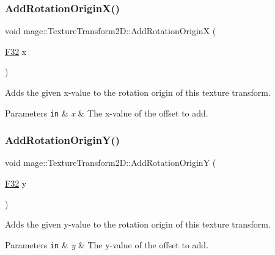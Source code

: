 \subsubsection{\texorpdfstring{Add\+Rotation\+Origin\+X()}{AddRotationOriginX()}}
{\footnotesize\ttfamily void mage\+::\+Texture\+Transform2\+D\+::\+Add\+Rotation\+OriginX (\begin{DoxyParamCaption}\item[{\mbox{\hyperlink{namespacemage_aa97e833b45f06d60a0a9c4fc22ae02c0}{F32}}}]{x }\end{DoxyParamCaption})\hspace{0.3cm}{\ttfamily [noexcept]}}

Adds the given x-\/value to the rotation origin of this texture transform.


\begin{DoxyParams}[1]{Parameters}
\mbox{\tt in}  & {\em x} & The x-\/value of the offset to add. \\
\hline
\end{DoxyParams}
\mbox{\label{classmage_1_1_texture_transform2_d_af13de9a111c3c312281174883a3257d0}} 
\subsubsection{\texorpdfstring{Add\+Rotation\+Origin\+Y()}{AddRotationOriginY()}}
{\footnotesize\ttfamily void mage\+::\+Texture\+Transform2\+D\+::\+Add\+Rotation\+OriginY (\begin{DoxyParamCaption}\item[{\mbox{\hyperlink{namespacemage_aa97e833b45f06d60a0a9c4fc22ae02c0}{F32}}}]{y }\end{DoxyParamCaption})\hspace{0.3cm}{\ttfamily [noexcept]}}

Adds the given y-\/value to the rotation origin of this texture transform.


\begin{DoxyParams}[1]{Parameters}
\mbox{\tt in}  & {\em y} & The y-\/value of the offset to add. \\
\hline
\end{DoxyParams}
\mbox{\label{classmage_1_1_texture_transform2_d_aa66a44244931c2c6405c08de8761eccf}} 
